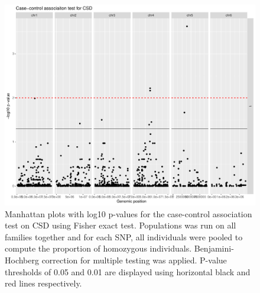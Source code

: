 \documentclass[10pt,a4paper]{report}
\begin{document}
\begin{figure}[h]
	\begin{center}
		\includegraphics[width=\textwidth]{association_mapping/fisher_BH.pdf}
		\caption{Manhattan plots with log10 p-values for the case-control association test on CSD using Fisher exact test. Populations was run on all families together and for each SNP, all individuals were pooled to compute the proportion of homozygous individuals. Benjamini-Hochberg correction for multiple testing was applied. P-value thresholds of 0.05 and 0.01 are displayed using horizontal black and red lines respectively.}
		\label{fisher_BH}
	\end{center}
\end{figure}
\end{document}
